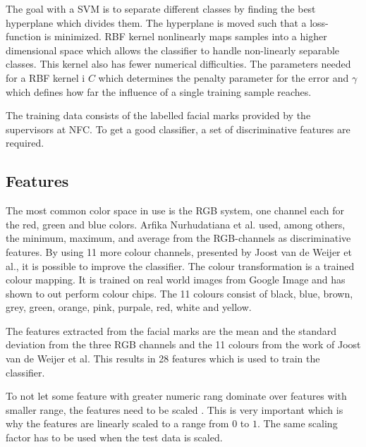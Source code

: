 The goal with a SVM is to separate different classes by finding the best hyperplane which divides them. The hyperplane is moved such that a loss-function is minimized. RBF kernel nonlinearly maps samples into a higher dimensional space which allows the classifier to handle non-linearly separable classes. This kernel also has fewer numerical difficulties. The parameters needed for a RBF kernel i $C$ which determines the penalty parameter for the error and $\gamma$ which defines how far the influence of a single training sample reaches. \cite{svm_guide}

The training data consists of the labelled facial marks provided by the supervisors at NFC. To get a good classifier, a set of discriminative features are required.

\subsection{Features}

The most common color space in use is the RGB system, one channel each for the red, green and blue colors. Arfika Nurhudatiana et al. \cite{svm_marks} used, among others, the minimum, maximum, and average from the RGB-channels as discriminative features. By using 11 more colour channels, presented by Joost van de Weijer et al.\cite{11_colours}, it is possible to improve the classifier. The colour transformation is a trained colour mapping. It is trained on real world images from Google Image and has shown to out perform colour chips. The 11 colours consist of black, blue, brown, grey, green, orange, pink, purpale, red, white and yellow.

The features extracted from the facial marks are the mean and the standard deviation from the three RGB channels and the 11 colours from the work of Joost van de Weijer et al. This results in 28 features which is used to train the classifier. 

To not let some feature with greater numeric rang dominate over features with smaller range, the features need to be scaled \cite{svm_guide}. This is very important which is why the features are linearly scaled to a range from $0$ to $1$. The same scaling factor has to be used when the test data is scaled. 






  